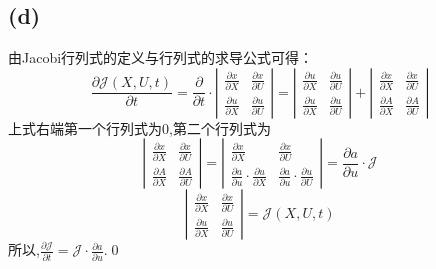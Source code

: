 \documentclass[12pt]{article}
\begin{document}
\subsection{(d)}

由Jacobi行列式的定义与行列式的求导公式可得：
\begin{equation}
	\frac{\partial \mathscr{J}(X,U,t)}{\partial t} =\frac{\partial}{\partial t}\cdot
{\left|
	\begin{array}{ccc}
    	\frac{\partial x}{\partial X} & \frac{\partial x}{\partial U}\\
    	\frac{\partial u}{\partial X} & \frac{\partial u}{\partial U}
	\end{array} 	
\right |} = 
{\left|
	\begin{array}{ccc}
		\frac{\partial u}{\partial X} & \frac{\partial u}{\partial U}\\
		\frac{\partial u}{\partial X} & \frac{\partial u}{\partial U}
	\end{array} 	
\right |} + 
{\left|
	\begin{array}{ccc}
		\frac{\partial x}{\partial X} & \frac{\partial x}{\partial U}\\
		\frac{\partial A}{\partial X} & \frac{\partial A}{\partial U}
	\end{array} 	
	\right |}
\end{equation}
上式右端第一个行列式为$0$,第二个行列式为
\begin{equation}
	{\left|
	\begin{array}{ccc}
		\frac{\partial x}{\partial X} & \frac{\partial x}{\partial U}\\
		\frac{\partial A}{\partial X} & \frac{\partial A}{\partial U}
	\end{array} 	
	\right |} = 
{\left|
	\begin{array}{ccc}
		\frac{\partial x}{\partial X} & \frac{\partial x}{\partial U}\\
		\frac{\partial a}{\partial u}\cdot\frac{\partial u}{\partial X} & \frac{\partial a}{\partial u}\cdot\frac{\partial u}{\partial U}
	\end{array} 	
	\right |} = 
\frac{\partial a}{\partial u}\cdot \mathscr{J}
\end{equation}
\begin{equation}
{\left|
	\begin{array}{ccc}
		\frac{\partial x}{\partial X} & \frac{\partial x}{\partial U}\\
		\frac{\partial u}{\partial X} & \frac{\partial u}{\partial U}
	\end{array} 	
	\right |} = 
\mathscr{J}(X,U,t)
\end{equation}
所以,$\frac{\partial \mathscr{J}}{\partial t} = \mathscr{J}\cdot\frac{\partial a}{\partial u}$.\qed
\end{document}
